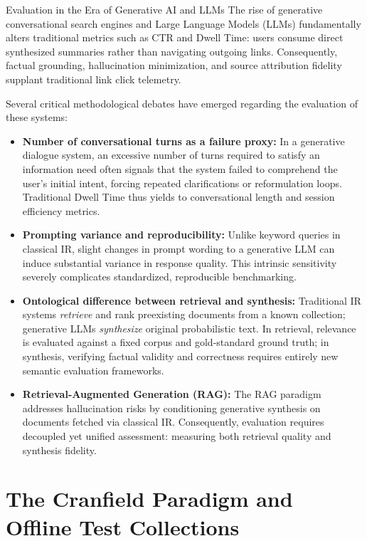 \begin{alertblock}{Evaluation in the Era of Generative AI and LLMs}
The rise of generative conversational search engines and Large Language Models (LLMs) fundamentally alters traditional metrics such as CTR and Dwell Time: users consume direct synthesized summaries rather than navigating outgoing links. Consequently, factual grounding, hallucination minimization, and source attribution fidelity supplant traditional link click telemetry.

Several critical methodological debates have emerged regarding the evaluation of these systems:
\begin{itemize}
    \item \textbf{Number of conversational turns as a failure proxy:} In a generative dialogue system, an excessive number of turns required to satisfy an information need often signals that the system failed to comprehend the user's initial intent, forcing repeated clarifications or reformulation loops. Traditional Dwell Time thus yields to conversational length and session efficiency metrics.
    \item \textbf{Prompting variance and reproducibility:} Unlike keyword queries in classical IR, slight changes in prompt wording to a generative LLM can induce substantial variance in response quality. This intrinsic sensitivity severely complicates standardized, reproducible benchmarking.
    \item \textbf{Ontological difference between retrieval and synthesis:} Traditional IR systems \emph{retrieve} and rank preexisting documents from a known collection; generative LLMs \emph{synthesize} original probabilistic text. In retrieval, relevance is evaluated against a fixed corpus and gold-standard ground truth; in synthesis, verifying factual validity and correctness requires entirely new semantic evaluation frameworks.
    \item \textbf{Retrieval-Augmented Generation (RAG):} The RAG paradigm addresses hallucination risks by conditioning generative synthesis on documents fetched via classical IR. Consequently, evaluation requires decoupled yet unified assessment: measuring both retrieval quality and synthesis fidelity.
\end{itemize}
\end{alertblock}

\FloatBarrier
\section{The Cranfield Paradigm and Offline Test Collections}

